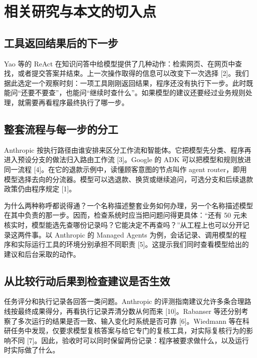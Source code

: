 \documentclass[UTF8,12pt,a4paper,fontset=none]{ctexart}
\begin{document}
\section{相关研究与本文的切入点}

\subsection{工具返回结果后的下一步}

Yao 等的 ReAct 在知识问答中给模型提供了几种动作：检索网页、在网页中查找，或者提交答案并结束。上一次操作取得的信息可以改变下一次选择 [2]。我们据此选定一个观察时刻：一项工具刚刚返回结果，程序还没有执行下一步。此时既能问“还要不要查”，也能问“继续时查什么”。如果模型的建议还要经过业务规则处理，就需要再看程序最终执行了哪一步。\par

\subsection{整套流程与每一步的分工}

Anthropic 按执行路径由谁安排来区分工作流和智能体。它把模型先分类、程序再进入预设分支的做法归入路由工作流 [3]。Google 的 ADK 可以把模型和规则放进同一流程 [4]。在它的退款示例中，读懂顾客意图的节点叫作 agent router，即用模型选择去向的分流器。模型可以选退款、换货或继续追问，可选分支和后续退款政策仍由程序规定 [1]。\par

为什么两种称呼都说得通？一个名称描述整套业务如何办理，另一个名称描述模型在其中负责的那一步。因而，检查系统时应当把问题问得更具体：“还有 50 元未核实时，模型能选先查哪份记录吗？它能决定不再查吗？”从工程上也可以分开记录这两件事。以 Anthropic 的 Managed Agents 为例，会话记录、调用模型的程序和实际运行工具的环境分别承担不同职责 [5]。这提示我们同时查看模型给出的建议和后台采取的动作。\par

\subsection{从比较行动后果到检查建议是否生效}

任务评分和执行记录各回答一类问题。Anthropic 的评测指南建议允许多条合理路线按最终成果得分，再看执行记录弄清分数从何而来 [10]。Rabanser 等还分别考察了多次运行的结果是否一致、输入变化时系统是否可靠 [6]。Wiedmann 等在科研任务中发现，仅要求模型复核答案与给它专门的复核工具，对实际复核行为的影响不同 [7]。因此，验收时可以同时保留两份记录：程序被要求做什么，以及运行时实际做了什么。\par
\end{document}
